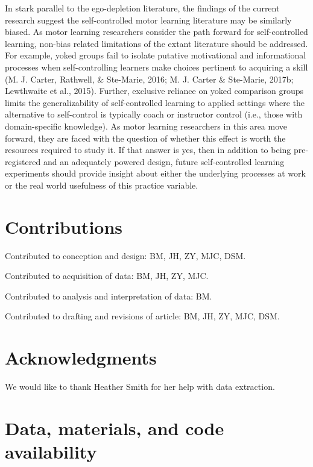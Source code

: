 \documentclass[
  english,
  man,floatsintext]{apa7}
\begin{document}
In stark parallel to the ego-depletion literature, the findings of the current research suggest the self-controlled motor learning literature may be similarly biased. As motor learning researchers consider the path forward for self-controlled learning, non-bias related limitations of the extant literature should be addressed. For example, yoked groups fail to isolate putative motivational and informational processes when self-controlling learners make choices pertinent to acquiring a skill (M. J. Carter, Rathwell, \& Ste-Marie, 2016; M. J. Carter \& Ste-Marie, 2017b; Lewthwaite et al., 2015). Further, exclusive reliance on yoked comparison groups limits the generalizability of self-controlled learning to applied settings where the alternative to self-control is typically coach or instructor control (i.e., those with domain-specific knowledge). As motor learning researchers in this area move forward, they are faced with the question of whether this effect is worth the resources required to study it. If that answer is yes, then in addition to being pre-registered and an adequately powered design, future self-controlled learning experiments should provide insight about either the underlying processes at work or the real world usefulness of this practice variable.

\hypertarget{contributions}{%
\section{Contributions}\label{contributions}}

Contributed to conception and design: BM, JH, ZY, MJC, DSM.

Contributed to acquisition of data: BM, JH, ZY, MJC.

Contributed to analysis and interpretation of data: BM.

Contributed to drafting and revisions of article: BM, JH, ZY, MJC, DSM.

\hypertarget{acknowledgments}{%
\section{Acknowledgments}\label{acknowledgments}}

We would like to thank Heather Smith for her help with data extraction.

\hypertarget{data-materials-and-code-availability}{%
\section{Data, materials, and code availability}\label{data-materials-and-code-availability}}
\end{document}
